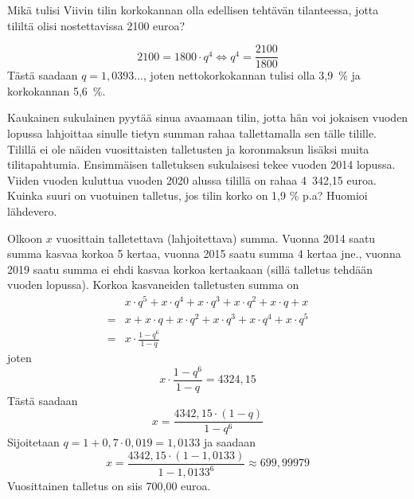 \documentclass[a4paper,10pt]{article}\usepackage[]{graphicx}\usepackage[]{color}
\begin{document}
\begin{question} Mikä tulisi Viivin tilin korkokannan olla edellisen tehtävän tilanteessa, jotta tililtä olisi nostettavissa 2100 euroa?
\end{question}\begin{solution}
    \[
        2100 = 1800\cdot q^4\Leftrightarrow q^4 = \frac{2100}{1800}
    \]
    Tästä saadaan \(q = 1,0393\dots\), joten nettokorkokannan tulisi olla 3,9~\% ja korkokannan 5,6~\%.
\end{solution}

\begin{question} Kaukainen sukulainen pyytää sinua avaamaan tilin, jotta hän voi jokaisen vuoden lopussa lahjoittaa sinulle tietyn
summan rahaa tallettamalla sen tälle tilille. Tilillä ei ole näiden vuosittaisten talletusten ja koronmaksun lisäksi muita tilitapahtumia.
Ensimmäisen talletuksen sukulaisesi tekee vuoden 2014 lopussa. Viiden vuoden kuluttua vuoden 2020 alussa tilillä on rahaa 4~342{,}15 euroa.
Kuinka suuri on vuotuinen talletus, jos tilin korko on 1{,}9 \% p.a? Huomioi lähdevero.
\end{question}\begin{solution}
Olkoon \(x\) vuosittain talletettava (lahjoitettava) summa. Vuonna 2014 saatu summa kasvaa korkoa 5 kertaa,
vuonna 2015 saatu summa 4 kertaa jne., vuonna 2019 saatu summa ei ehdi kasvaa korkoa kertaakaan
(sillä talletus tehdään vuoden lopussa). Korkoa kasvaneiden talletusten summa on
\begin{align*}
    &x\cdot q^5 + x\cdot q^4+ x\cdot q^3 + x\cdot q^2+ x\cdot q + x \\
    =& x + x\cdot q+ x\cdot q^2 + x\cdot q^3+ x\cdot q^4 + x\cdot q^5\\
    =& x\cdot\frac{1-q^6}{1-q}
\end{align*}
joten
\[
   x\cdot\frac{1-q^6}{1-q} = 4324,15
\]
Tästä saadaan
\[
    x = \frac{4342,15\cdot(1-q)}{1-q^6}
\]
Sijoitetaan \(q= 1 + 0,7\cdot0,019=1,0133\) ja saadaan
\[
x = \frac{4342,15\cdot(1-1,0133)}{1-1,0133^6} \approx 699,99979
\]
Vuosittainen talletus on siis 700,00 euroa.
\end{solution}
\end{document}
